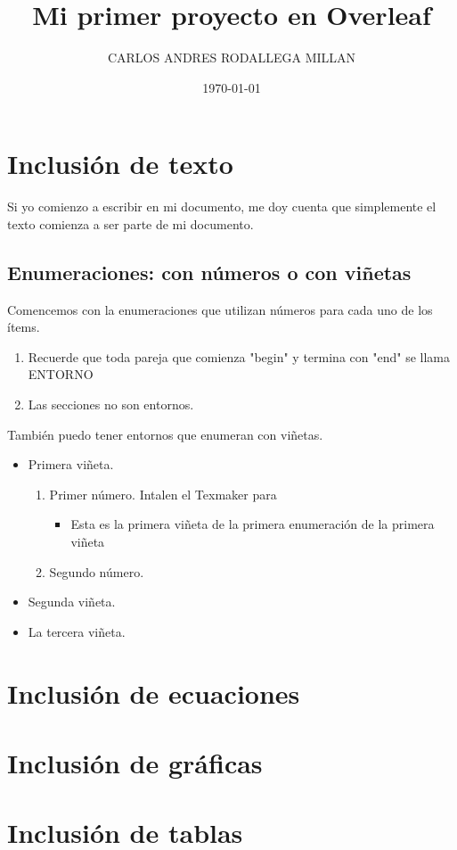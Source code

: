 \documentclass[onecolumn]{article} %
\title{Mi primer proyecto en Overleaf}
\author{CARLOS ANDRES RODALLEGA MILLAN}
\date{\today}
\begin{document}
\maketitle %
\section{Inclusión de texto} %
Si yo comienzo a escribir en mi documento, me doy cuenta que simplemente el texto comienza a ser parte de mi documento.
\subsection{Enumeraciones: con números o con viñetas}
Comencemos con la enumeraciones que utilizan números para cada uno de los ítems.
\begin{enumerate}
    \item Recuerde que toda pareja que comienza "begin" y termina con "end" se llama ENTORNO
    \item Las secciones no son entornos.
\end{enumerate}
También puedo tener entornos que enumeran con viñetas.
\begin{itemize}
    \item Primera viñeta.
    \begin{enumerate}
        \item Primer número.
        Intalen el Texmaker para   
        \begin{itemize}
            \item Esta es la primera viñeta de la primera enumeración de la primera viñeta
        \end{itemize}
        \item Segundo número.
    \end{enumerate}
    \item Segunda viñeta.
    \item La tercera viñeta.
\end{itemize}
\section{Inclusión de ecuaciones} %

\section{Inclusión de gráficas} %

\section{Inclusión de tablas} %
\end{document}
